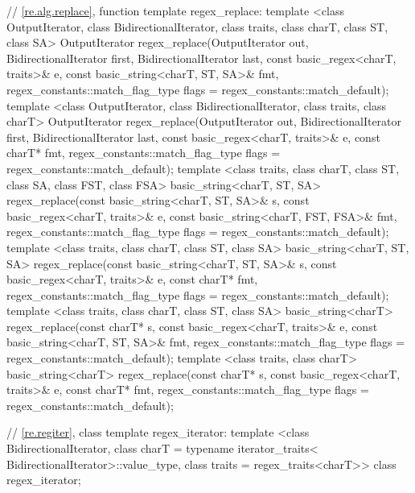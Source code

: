 \begin{codeblock}
{  // \ref{re.alg.replace}, function template regex_replace:
  template <class OutputIterator, class BidirectionalIterator,
      class traits, class charT, class ST, class SA>
    OutputIterator 
    regex_replace(OutputIterator out,
                  BidirectionalIterator first, BidirectionalIterator last,
                  const basic_regex<charT, traits>& e,
                  const basic_string<charT, ST, SA>& fmt,
                  regex_constants::match_flag_type flags =
                    regex_constants::match_default);
  template <class OutputIterator, class BidirectionalIterator,
      class traits, class charT>
    OutputIterator
    regex_replace(OutputIterator out,
                  BidirectionalIterator first, BidirectionalIterator last,
                  const basic_regex<charT, traits>& e,
                  const charT* fmt,
                  regex_constants::match_flag_type flags =
                    regex_constants::match_default);
  template <class traits, class charT, class ST, class SA,
      class FST, class FSA>
    basic_string<charT, ST, SA>
    regex_replace(const basic_string<charT, ST, SA>& s,
                  const basic_regex<charT, traits>& e,
                  const basic_string<charT, FST, FSA>& fmt,
                  regex_constants::match_flag_type flags =
                    regex_constants::match_default);
  template <class traits, class charT, class ST, class SA>
    basic_string<charT, ST, SA>
    regex_replace(const basic_string<charT, ST, SA>& s,
                  const basic_regex<charT, traits>& e,
                  const charT* fmt,
                  regex_constants::match_flag_type flags =
                    regex_constants::match_default);
  template <class traits, class charT, class ST, class SA>
    basic_string<charT>
    regex_replace(const charT* s,
                  const basic_regex<charT, traits>& e,
                  const basic_string<charT, ST, SA>& fmt,
                  regex_constants::match_flag_type flags =
                    regex_constants::match_default);
  template <class traits, class charT>
    basic_string<charT>
    regex_replace(const charT* s,
                  const basic_regex<charT, traits>& e,
                  const charT* fmt,
                  regex_constants::match_flag_type flags =
                    regex_constants::match_default);

  // \ref{re.regiter}, class template regex_iterator:
  template <class BidirectionalIterator, 
            class charT = typename iterator_traits<
              BidirectionalIterator>::value_type,
            class traits = regex_traits<charT>>
    class regex_iterator;

}
\end{codeblock}

